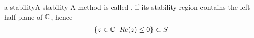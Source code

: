 \begin{Definition*}{a-stability}{A-stability}
  A method is called , if its stability region contains
  the left half-plane of $\mathbb C$, hence
  \begin{gather}
    \{ z \in \mathbb C | \ Re(z) \le 0 \} \subset S
  \end{gather}
\end{Definition*}
